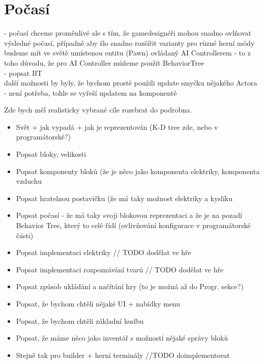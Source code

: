 \section{Počasí}
- počasí chceme proměnlivé ale s tím, že gamedesignéři mohou snadno ovlňovat výsledné počasí, případně aby šlo snadno rozšířit varianty pro různé herní módy\\
budeme mít ve světě umístenou entitu (Pawn) ovládaný AI Controllerem  - to z toho důvodu, že pro AI Controller můžeme použít BehaviorTree
\\
- popsat BT\\
další možnosti by byly, že bychom prostě použili update smyčku nějakého Actora - není potřeba, tohle se vyřeší updatem na komponentě


Zde bych měl realisticky vybrané cíle rozebrat do podrobna.

\begin{itemize}
	\item Svět + jak vypadá + jak je reprezentován (K-D tree zde, nebo v programátorské?)
	\item Popsat bloky, velikosti
	\item Popsat komponenty bloků (že je něco jako komponenta elektriky, komponenta vzduchu
	\item Popsat hratelnou postavičku (že má taky možnost elektriky a kyslíku
	\item Popsat počasí - že má taky svoji blokovou reprezentaci a že je na pozadí Behavior Tree, který to celé řídí (ovlivňování konfigurace v programátorské části)
	\item Popsat implementaci elektriky // TODO dodělat ve hře
	\item Popsat implementaci rozpoznávání tvarů // TODO dodělat ve hře
	\item Popsat způsob ukládání a načítání hry (to je možná až do Progr. sekce?)
	\item Popsat, že bychom chtěli nějaké UI + nabídky menu
	\item Popsat, že bychom chtěli základní hudbu
	\item Popsat, že máme něco jako inventář s možností nějaké správy bloků
	\item Stejně tak pro builder + herní terminály  //TODO doimplementovat
\end{itemize}
